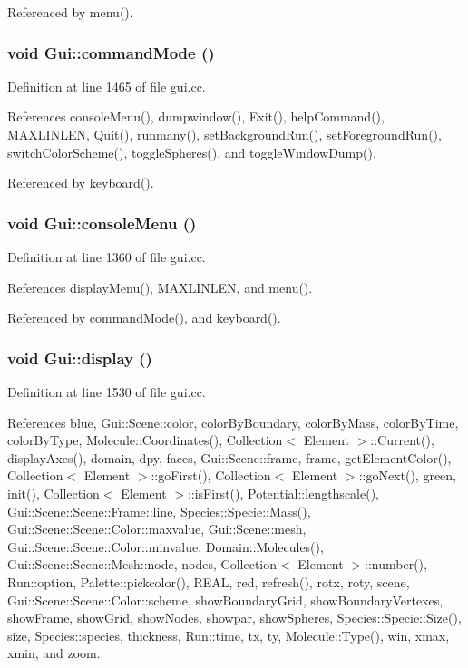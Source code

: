 Referenced by menu().\hypertarget{namespaceGui_90f0cf49fd3ea753450fa24a2a9675af}{
\subsubsection[{commandMode}]{\setlength{\rightskip}{0pt plus 5cm}void Gui::commandMode ()}}
\label{namespaceGui_90f0cf49fd3ea753450fa24a2a9675af}




Definition at line 1465 of file gui.cc.

References consoleMenu(), dumpwindow(), Exit(), helpCommand(), MAXLINLEN, Quit(), runmany(), setBackgroundRun(), setForegroundRun(), switchColorScheme(), toggleSpheres(), and toggleWindowDump().

Referenced by keyboard().\hypertarget{namespaceGui_8b9da92ca9a1573368c0a085b1121d54}{
\subsubsection[{consoleMenu}]{\setlength{\rightskip}{0pt plus 5cm}void Gui::consoleMenu ()}}
\label{namespaceGui_8b9da92ca9a1573368c0a085b1121d54}




Definition at line 1360 of file gui.cc.

References displayMenu(), MAXLINLEN, and menu().

Referenced by commandMode(), and keyboard().\hypertarget{namespaceGui_cb047c1330f58d16c1f9336aef134bbf}{
\subsubsection[{display}]{\setlength{\rightskip}{0pt plus 5cm}void Gui::display ()}}
\label{namespaceGui_cb047c1330f58d16c1f9336aef134bbf}




Definition at line 1530 of file gui.cc.

References blue, Gui::Scene::color, colorByBoundary, colorByMass, colorByTime, colorByType, Molecule::Coordinates(), Collection$<$ Element $>$::Current(), displayAxes(), domain, dpy, faces, Gui::Scene::frame, frame, getElementColor(), Collection$<$ Element $>$::goFirst(), Collection$<$ Element $>$::goNext(), green, init(), Collection$<$ Element $>$::isFirst(), Potential::lengthscale(), Gui::Scene::Scene::Frame::line, Species::Specie::Mass(), Gui::Scene::Scene::Color::maxvalue, Gui::Scene::mesh, Gui::Scene::Scene::Color::minvalue, Domain::Molecules(), Gui::Scene::Scene::Mesh::node, nodes, Collection$<$ Element $>$::number(), Run::option, Palette::pickcolor(), REAL, red, refresh(), rotx, roty, scene, Gui::Scene::Scene::Color::scheme, showBoundaryGrid, showBoundaryVertexes, showFrame, showGrid, showNodes, showpar, showSpheres, Species::Specie::Size(), size, Species::species, thickness, Run::time, tx, ty, Molecule::Type(), win, xmax, xmin, and zoom.

